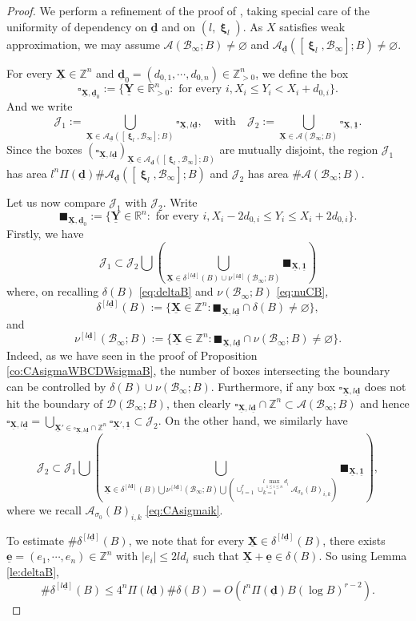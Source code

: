 \documentclass[11pt,letterpaper]{amsart}
\newcommand{\BR}{{\mathbb {R}}}
\newcommand{\BZ}{{\mathbb {Z}}}
\newcommand{\CA}{{\mathcal {A}}}
\newcommand{\CB}{{\mathcal {B}}}
\newcommand{\CD}{{\mathcal {D}}}
\newcommand{\CJ}{{\mathcal {J}}}
\newcommand{\XX}{\underline{\mathbf{X}}}
\newcommand{\YY}{\underline{\mathbf{Y}}}
\newcommand{\dd}{\underline{\mathbf{d}}}
\newcommand{\ee}{\underline{\mathbf{e}}}
\newcommand{\one}{\underline{\mathbf{1}}}
\DeclareMathOperator{\bxi}{\mathbf{\xi}}
\theoremstyle{plain}
\numberwithin{equation}{section}
\theoremstyle{definition}
\theoremstyle{remark}
\begin{document}
\begin{proof}
	We perform a refinement of the proof of \cite[Lemma 11.26]{Salberger}, taking special care of the uniformity of dependency on $\dd$ and on $(l,\bxi_l)$. 
	As $X$ satisfies weak approximation, we may assume $\CA(\CB_\infty;B)\neq\varnothing$ and $\CA_{\dd}([\bxi_l,\CB_\infty];B)\neq\varnothing$. 
	
	
	For every $\XX\in\BZ^n$ and $\dd_{0}=(d_{0,1},\cdots,d_{0,n})\in\BZ_{>0}^n$, we define the box
	$$\square_{\XX,\dd_0}:=\{\YY\in\BR_{>0}^n:\text{ for every }i,X_i\leqslant Y_i<X_i+d_{0,i}\}.$$
	And we write
	$$\CJ_1:=\bigcup_{\XX\in\CA_{\dd}([\bxi_l,\CB_\infty];B)} \square_{\XX,l\dd},\quad \text{with} \quad \CJ_2:=\bigcup_{\XX\in \CA(\CB_\infty;B)}\square_{\XX,\underline{\mathbf{1}}}.$$
	Since the boxes $(\square_{\XX,l\dd})_{\XX\in\CA_{\dd}([\bxi_l,\CB_\infty];B)}$ are mutually disjoint, the region $\CJ_1$ has area $l^n\Pi(\dd)\#\CA_{\dd}([\bxi_l,\CB_\infty];B)$ and $\CJ_2$ has area $\#\CA(\CB_\infty;B)$.
	
	Let us now compare $\CJ_1$ with $\CJ_2$.
	Write $$\blacksquare_{\XX,\dd_0}:=\{\YY\in\BR^n:\text{ for every }i,X_i-2d_{0,i}\leqslant Y_i\leqslant X_i+2d_{0,i}\}.$$ 
	Firstly, we have
	$$\CJ_1\subset \CJ_2\bigcup\left(\bigcup_{\XX\in\delta^{[l\dd]}(B)\cup\nu^{[l\dd]}(\CB_\infty;B)}\blacksquare_{\XX,\one}\right)$$ where, on recalling $\delta(B)$ \eqref{eq:deltaB} and $\nu(\CB_\infty;B)$ \eqref{eq:nuCB}, $$\delta^{[l\dd]}(B):=\{\XX\in\BZ^n:\blacksquare_{\XX,l\dd}\cap\delta(B)\neq\varnothing\},$$ and $$\nu^{[l\dd]}(\CB_\infty;B):=\{\XX\in\BZ^n:\blacksquare_{\XX,l\dd}\cap\nu(\CB_\infty;B)\neq\varnothing\}.$$ 
	Indeed, as we have seen in the proof of Proposition \ref{co:CAsigmaWBCDWsigmaB}, the number of boxes intersecting the boundary can be controlled by $\delta(B)\cup\nu(\CB_\infty;B)$. Furthermore, if any box $\square_{\XX,l\dd}$ does not hit the boundary of $\CD(\CB_\infty;B)$, then clearly $\square_{\XX,l\dd}\cap\BZ^n\subset\CA(\CB_\infty;B)$ and hence  $\square_{\XX,l\dd}=\bigcup_{\XX'\in \square_{\XX,l\dd}\cap\BZ^n} \square_{\XX',\one}\subset \CJ_2$. 
	On the other hand, we similarly have
	$$\CJ_2\subset \CJ_1\bigcup\left(\bigcup_{\XX\in\delta^{[l\dd]}(B)\bigcup \nu^{[l\dd]}(\CB_\infty;B)\bigcup\left( \cup_{i=1}^{r}\cup_{k=1}^{l\max_{1\leqslant i\leqslant n} d_i} \CA_{\sigma_0}(B)_{i,k}\right)}\blacksquare_{\XX,\one}\right),$$
	where we recall $\CA_{\sigma_0}(B)_{i,k}$ \eqref{eq:CAsigmaik}.
	
	To estimate $\#\delta^{[l\dd]}(B)$, we note that for every $\XX\in\delta^{[l\dd]}(B)$, there exists $\ee=(e_1,\cdots,e_n)\in\BZ^n$ with $|e_i|\leqslant 2ld_i$ such that $\XX+\ee\in\delta(B)$. So using Lemma \ref{le:deltaB}, 
	$$\#\delta^{[l\dd]}(B)\leqslant 4^n\Pi(l\dd)\#\delta(B)=O(l^n\Pi(\dd)B(\log B)^{r-2}).$$
	

\end{proof}
\end{document}

